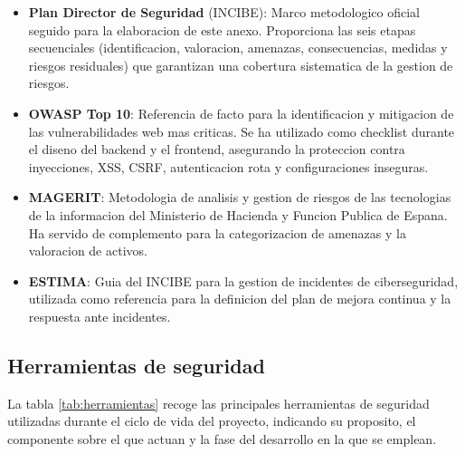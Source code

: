 \documentclass[11pt, a4paper]{article}
\begin{document}
\begin{itemize}
    \item \textbf{Plan Director de Seguridad} (INCIBE): Marco metodologico oficial seguido para la elaboracion de este anexo. Proporciona las seis etapas secuenciales (identificacion, valoracion, amenazas, consecuencias, medidas y riesgos residuales) que garantizan una cobertura sistematica de la gestion de riesgos.
    \item \textbf{OWASP Top 10}: Referencia de facto para la identificacion y mitigacion de las vulnerabilidades web mas criticas. Se ha utilizado como checklist durante el diseno del backend y el frontend, asegurando la proteccion contra inyecciones, XSS, CSRF, autenticacion rota y configuraciones inseguras.
    \item \textbf{MAGERIT}: Metodologia de analisis y gestion de riesgos de las tecnologias de la informacion del Ministerio de Hacienda y Funcion Publica de Espana. Ha servido de complemento para la categorizacion de amenazas y la valoracion de activos.
    \item \textbf{ESTIMA}: Guia del INCIBE para la gestion de incidentes de ciberseguridad, utilizada como referencia para la definicion del plan de mejora continua y la respuesta ante incidentes.
\end{itemize}

\subsection{Herramientas de seguridad}

La tabla \ref{tab:herramientas} recoge las principales herramientas de seguridad utilizadas durante el ciclo de vida del proyecto, indicando su proposito, el componente sobre el que actuan y la fase del desarrollo en la que se emplean.
\end{document}
